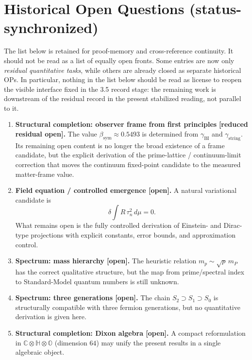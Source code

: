 \section*{Historical Open Questions (status-synchronized)}
The list below is retained for proof-memory and cross-reference continuity.
It should not be read as a list of equally open fronts. Some entries are now
only \emph{residual quantitative tasks}, while others are already closed as
separate historical OPs. In particular, nothing in the list below should be
read as license to reopen the visible interface fixed in the 3.5 record stage:
the remaining work is downstream of the residual record in the present stabilized reading, not parallel to it.

\begin{enumerate}
  \item \textbf{Structural completion: observer frame from first principles}
        \textbf{[reduced residual open].}
        The value $\beta_{\mathrm{sym}} \approx 0.5493$ is determined from
        $\gamma_{\mathrm{BI}}$ and $\gamma_{\mathrm{string}}$. Its remaining
        open content is no longer the broad existence of a frame candidate,
        but the explicit derivation of the prime-lattice / continuum-limit
        correction that moves the continuum fixed-point candidate to the
        measured matter-frame value.

  \item \textbf{Field equation / controlled emergence [open].}
        A natural variational candidate is
  \[
  \delta \int R \, \tau_n^2 \, d\mu = 0.
  \]
        What remains open is the fully controlled derivation of Einstein- and
        Dirac-type projections with explicit constants, error bounds, and
        approximation control.

  \item \textbf{Spectrum: mass hierarchy [open].}
        The heuristic relation $m_p \sim \sqrt{p}\,m_P$ has the correct
        qualitative structure, but the map from prime/spectral index to
        Standard-Model quantum numbers is still unknown.

  \item \textbf{Spectrum: three generations [open].}
        The chain $S_2 \supset S_1 \supset S_0$ is structurally compatible
        with three fermion generations, but no quantitative derivation is
        given here.

  \item \textbf{Structural completion: Dixon algebra [open].}
        A compact reformulation in $\mathbb{C} \otimes \mathbb{H} \otimes
        \mathbb{O}$ (dimension $64$) may unify the present results in a
        single algebraic object.


\end{enumerate}
